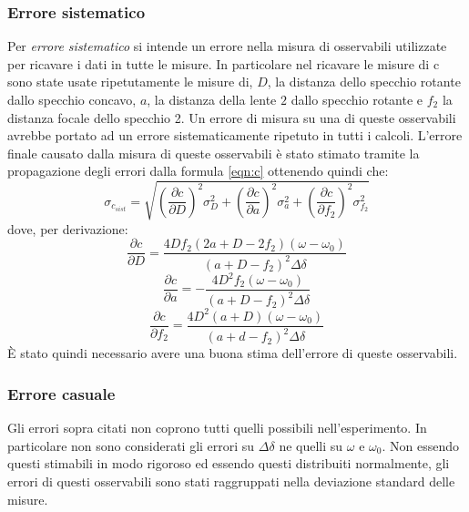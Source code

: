 \documentclass[a4paper,11pt]{article}
\begin{document}
	\subsubsection{Errore sistematico}
	Per \emph{errore sistematico} si intende un errore nella misura di osservabili utilizzate per ricavare i dati in tutte le misure. In particolare nel ricavare le misure di c sono state usate ripetutamente le misure di, $ D $, la distanza dello specchio rotante dallo specchio concavo, $ a $, la distanza della lente $ 2 $ dallo specchio rotante e $ f_2 $ la distanza focale dello specchio 2. Un errore di misura su una di queste osservabili avrebbe portato ad un errore sistematicamente ripetuto in tutti i calcoli. L'errore finale causato dalla misura di queste osservabili è stato stimato tramite la propagazione degli errori dalla formula \ref{eqn:c} ottenendo quindi che:
	\begin{equation}\label{eqn:sigmac}
		\sigma_{c_{sist}} = \sqrt{\left(\frac{\partial c}{\partial D}\right)^2\sigma_D^2+
			\left(\frac{\partial c}{\partial a}\right)^2\sigma_a^2+\left(\frac{\partial c}{\partial f_2}\right)^2\sigma_{f_2}^2}
	\end{equation}
	dove, per derivazione:
	\begin{equation}\label{eqn:cderivD}
		\frac{\partial c}{\partial D}=\dfrac{4Df_2(2a+D-2f_2)(\omega-\omega_0)}{(a+D-f_2)^2\Delta\delta}
	\end{equation}
	\begin{equation}\label{eqn:deriva}
		\frac{\partial c}{\partial a} = - \dfrac{4D^2f_2(\omega-\omega_0)}{\left(a+D-f_2\right)^2\Delta\delta}
	\end{equation}
	\begin{equation}\label{eqn:derivf2}
		\frac{\partial c}{\partial f_2}=\frac{4D^2(a+D)(\omega-\omega_0)}{(a+d-f_2)^2\Delta\delta}
	\end{equation}
	È stato quindi necessario avere una buona stima dell'errore di queste osservabili. \\
	
	\subsubsection{Errore casuale}
	Gli errori sopra citati non coprono tutti quelli possibili nell'esperimento. In particolare non sono considerati gli errori su $ \Delta\delta $ ne quelli su $ \omega $ e $ \omega_0 $.	Non essendo questi stimabili in modo rigoroso ed essendo questi distribuiti normalmente, gli errori di questi osservabili sono stati raggruppati nella deviazione standard delle misure.
	
\end{document}
